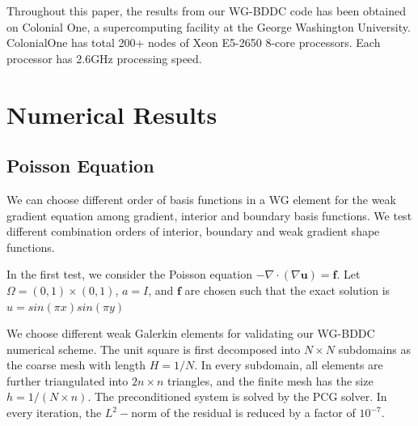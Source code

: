 Throughout this paper, the results from our WG-BDDC code has been obtained on Colonial One, a supercomputing facility at the George Washington University. ColonialOne has total 200+ nodes of Xeon E5-2650 8-core processors. Each processor has 2.6GHz processing speed.



\section{Numerical Results}

\subsection{Poisson Equation}
We can choose different order of basis functions in a WG element for the weak gradient equation among gradient, interior and boundary basis functions. We test different combination orders of interior, boundary and weak gradient shape functions. 

In the first test, we consider the Poisson equation $ -\nabla \cdot (\nabla \mathbf{u}) = \mathbf{f} $. Let $ \Omega = (0, 1) \times (0, 1) $, $ a = I $, and $ \mathbf{f} $ are chosen such that the exact solution is $ u = sin(\pi x) sin(\pi y) $

We choose different weak Galerkin elements for validating our WG-BDDC numerical scheme. The unit square is first decomposed into $ N \times N $ subdomains as the coarse mesh with length $ H = 1 / N $. In every subdomain, all elements are further triangulated into $ 2 n \times n $ triangles, and the finite mesh has the size $ h = 1/(N\times n) $. The preconditioned system is solved by the PCG solver. In every iteration, the $ L^2- $norm of the residual is reduced by a factor of $ 10^{-7} $.

